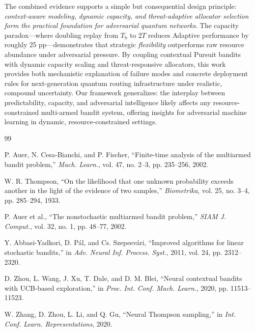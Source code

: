 \documentclass[sigconf,anonymous]{acmart}
\newcommand{\Tb}{T_{\text{b}}}
\newcommand{\TwoT}{2T}
\begin{document}
The combined evidence supports a simple but consequential design principle: \emph{context-aware modeling, dynamic capacity, and threat-adaptive allocator selection form the practical foundation for adversarial quantum networks}. The capacity paradox—where doubling replay from $\Tb$ to $\TwoT$ reduces Adaptive performance by roughly 25 pp—demonstrates that strategic \textit{flexibility} outperforms raw resource abundance under adversarial pressure. By coupling contextual Pursuit bandits with dynamic capacity scaling and threat-responsive allocators, this work provides both mechanistic explanation of failure modes and concrete deployment rules for next-generation quantum routing infrastructure under realistic, compound uncertainty. Our framework generalizes: the interplay between predictability, capacity, and adversarial intelligence likely affects any resource-constrained multi-armed bandit system, offering insights for adversarial machine learning in dynamic, resource-constrained settings.

\balance


\begin{thebibliography}{99}

 P. Auer, N. Cesa-Bianchi, and P. Fischer, ``Finite-time analysis of the multiarmed bandit problem,'' \textit{Mach. Learn.}, vol. 47, no. 2--3, pp. 235--256, 2002.

 W. R. Thompson, ``On the likelihood that one unknown probability exceeds another in the light of the evidence of two samples,'' \textit{Biometrika}, vol. 25, no. 3--4, pp. 285--294, 1933.

 P. Auer et al., ``The nonstochastic multiarmed bandit problem,'' \textit{SIAM J. Comput.}, vol. 32, no. 1, pp. 48--77, 2002.

 Y. Abbasi-Yadkori, D. Pál, and Cs. Szepesvári, ``Improved algorithms for linear stochastic bandits,'' in \textit{Adv. Neural Inf. Process. Syst.}, 2011, vol. 24, pp. 2312--2320.

 D. Zhou, L. Wang, J. Xu, T. Dale, and D. M. Blei, ``Neural contextual bandits with UCB-based exploration,'' in \textit{Proc. Int. Conf. Mach. Learn.}, 2020, pp. 11513--11523.

 W. Zhang, D. Zhou, L. Li, and Q. Gu, ``Neural Thompson sampling,'' in \textit{Int. Conf. Learn. Representations}, 2020.

\end{thebibliography}
\end{document}

